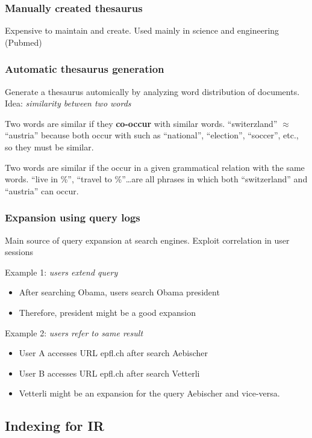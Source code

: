 \subsubsection{Manually created thesaurus}
Expensive to maintain and create. Used mainly in science and
engineering (Pubmed)

\subsubsection{Automatic thesaurus generation}
Generate a thesaurus automically by analyzing word distribution of
documents. Idea: \textit{similarity between two words}

Two words are similar if they \textbf{co-occur} with similar
words. ``switerzland'' $ \approx $ ``austria'' because both occur with
such as ``national'', ``election'', ``soccer'', etc., so they must be
similar.

Two words are similar if the occur in a given grammatical relation
with the same words. ``live in \%'', ``travel to \%''\ldots are all
phrases in which both ``switzerland'' and ``austria'' can occur.

\subsubsection{Expansion using query logs}
Main source of query expansion at search engines.
Exploit correlation in user sessions

Example 1: \textit{users extend query}
\begin{itemize}
\item After searching Obama, users search Obama president
\item Therefore, president might be a good expansion
\end{itemize}

Example 2: \textit{users refer to same result}
\begin{itemize}
\item User A accesses URL epfl.ch after search Aebischer
\item User B accesses URL epfl.ch after search Vetterli
\item Vetterli might be an expansion for the query Aebischer and
  vice-versa.
\end{itemize}

\subsection{Indexing for IR}

